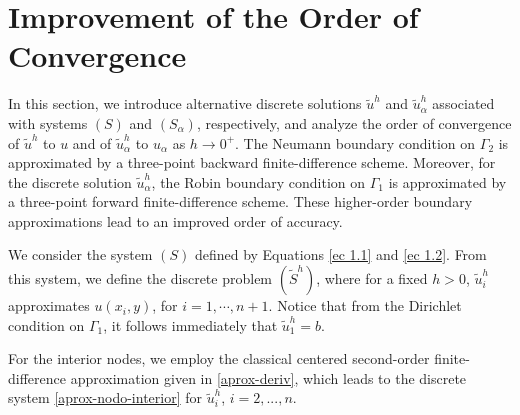 \documentclass[axioms,article,submit,moreauthors]{Definitions/mdpi}
\begin{document}
\section{Improvement of the Order of Convergence}\label{sec7}
In this section, we introduce alternative discrete solutions ${\widetilde{u}^h}$ and ${\widetilde{u}^h_\alpha}$ associated with systems $(S)$ and $(S_\alpha)$, respectively, and analyze the order of convergence of ${\widetilde{u}^h}$ to $u$ and of ${\widetilde{u}^h_\alpha}$ to $u_\alpha$ as $h \to 0^+$. The Neumann boundary condition on $\Gamma_2$ is approximated by a three-point backward finite-difference scheme. Moreover, for the discrete solution ${\widetilde{u}^h_\alpha}$, the Robin boundary condition on $\Gamma_1$ is approximated by a three-point forward finite-difference scheme. These higher-order boundary approximations lead to an improved order of accuracy.

We consider the system $(S)$ defined by Equations \eqref{ec 1.1} and \eqref{ec 1.2}. From this system, we define the discrete problem ${(\widetilde{S}^h)}$, where {for a fixed $h>0$}, $ {\widetilde{u}^h_i}$ approximates $u(x_i,y)$, for $i=1,\cdots, n+1$. Notice that from the Dirichlet condition on $\Gamma_1$, it follows immediately that ${\widetilde{u}^h_1} = b$.

For the interior nodes, we employ the classical centered second-order finite-difference approximation given in \eqref{aprox-deriv}, which leads to the discrete system \eqref{aprox-nodo-interior} for ${\widetilde{u}^h_i}$, $i=2,...,n$. 
\end{document}
